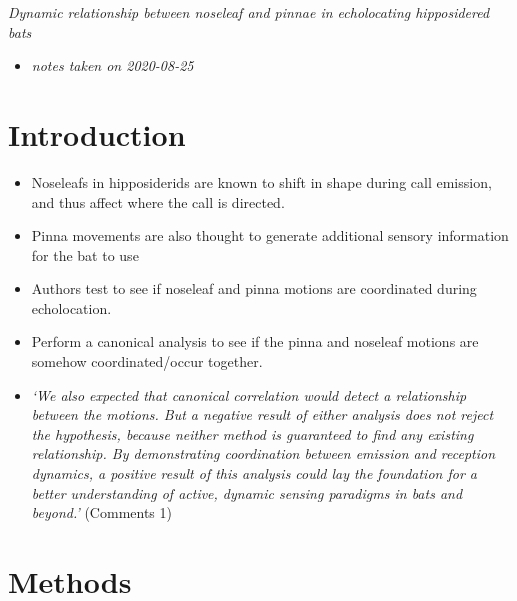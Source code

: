 \documentclass[
]{book}
\providecommand{\tightlist}{%
  \setlength{\itemsep}{0pt}\setlength{\parskip}{0pt}}
\begin{document}

\emph{Dynamic relationship between noseleaf and pinnae in echolocating hipposidered bats} \citep{zhang2019dynamic}

\begin{itemize}
\tightlist
\item
  \emph{notes taken on 2020-08-25}
\end{itemize}

\hypertarget{introduction}{%
\section{Introduction}\label{introduction}}

\begin{itemize}
\tightlist
\item
  Noseleafs in hipposiderids are known to shift in shape during call emission, and thus affect where the call is directed.
\item
  Pinna movements are also thought to generate additional sensory information for the bat to use
\item
  Authors test to see if noseleaf and pinna motions are coordinated during echolocation.
\item
  Perform a canonical analysis to see if the pinna and noseleaf motions are somehow coordinated/occur together.
\item
  \emph{`We also expected that canonical correlation would detect a relationship between the motions. But a negative result of either analysis does not reject the hypothesis, because neither method is guaranteed to find any existing relationship. By demonstrating coordination between emission and reception dynamics, a positive result of this analysis could lay the foundation for a better understanding of active, dynamic sensing paradigms in bats and beyond.'} (\protect\hypertarget{com_zhang}{}{Comments 1})
\end{itemize}

\hypertarget{methods}{%
\section{Methods}\label{methods}}
\end{document}

